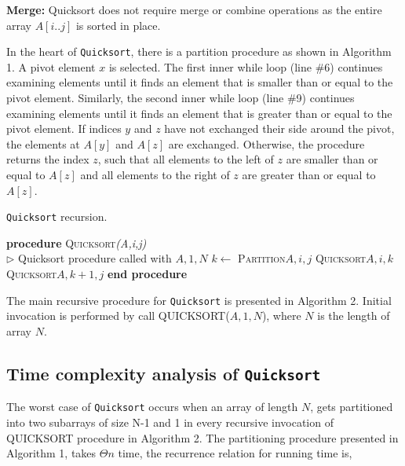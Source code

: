 \documentclass[twocolumn,a4paper]{article}
\newcommand{\tab}{\hspace{4mm} }
\begin{document}
        \noindent\textbf{Merge:} Quicksort does not require merge or combine operations as the entire array $A[i..j]$ is sorted in place.\par
            In the heart of \texttt{Quicksort}, there is a partition procedure as shown in Algorithm 1.
        A pivot element $x$ is selected.
        The first inner while loop (line \#6) continues examining elements until it finds an element that is smaller than or equal to the pivot element.
        Similarly, the second inner while loop (line \#9) continues examining elements until it finds an element that is greater than or equal to the pivot element.
        If indices $y$ and $z$ have not exchanged their side around the pivot, the elements at $A[y]$ and $A[z]$ are exchanged.
        Otherwise, the procedure returns the index $z$, such that all elements to the left of $z$ are smaller than or equal to $A[z]$ and all elements to the right of $z$ are greater than or equal to $A[z]$.\par

        \begin{algorithm}
            \caption{\texttt{Quicksort} recursion.}
            \begin{algorithmic}[1]
                \STATE \textbf{procedure} \textsc{Quicksort}\textit{(A,i,j)}\\
                    \(\triangleright\) Quicksort procedure called with $A, 1, N$
                        \STATE \tab $k \gets $ \textsc{Partition}{$A,i,j$}
                        \STATE \tab \textsc{Quicksort}{$A,i,k$}
                        \STATE \tab \textsc{Quicksort}{$A,k + 1,j$}
                    \ENDIF
                \STATE \textbf{end procedure}
            \end{algorithmic}
        \end{algorithm}
            The main recursive procedure for \texttt{Quicksort} is presented in Algorithm 2. Initial invocation is performed by call QUICKSORT($A, 1, N$), where $N$ is the length of array $N$.

        \subsection{Time complexity analysis of \texttt{\mdseries Quicksort}}

        The worst case of \texttt{Quicksort} occurs when an array of length $N$, gets partitioned into two subarrays of size N-1 and 1 in every recursive invocation of QUICKSORT procedure in Algorithm 2.
        The partitioning procedure presented in Algorithm 1, takes $\Theta{n}$ time, the recurrence relation for running time is,
\end{document}
